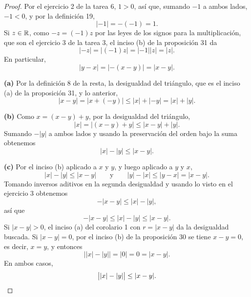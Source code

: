 \documentclass[12pt,a4paper]{article}
\begin{document}
    \begin{proof}
        Por el ejercicio 2 de la tarea 6, $1>0$, así que, sumando $-1$ a ambos lados, $-1<0$, y por la definición 19,
        \begin{equation*}
            |-1|=-(-1)=1.
        \end{equation*}
        Si $z\in\mathbb{R}$, como $-z=(-1)z$ por las leyes de los signos para la multiplicación, que son el ejercicio 3 de la tarea 3, el inciso (b) de la proposición 31 da
        \begin{equation*}
            |-z|=|(-1)z|=|-1||z|=|z|.
        \end{equation*}
        En particular,
        \begin{equation*}
            |y-x|=|-(x-y)|=|x-y|.
        \end{equation*}

        \textbf{(a)} Por la definición 8 de la resta, la desigualdad del triángulo, que es el inciso (a) de la proposición 31, y lo anterior,
        \begin{equation*}
            |x-y|=|x+(-y)|\leq|x|+|-y|=|x|+|y|.
        \end{equation*}

        \textbf{(b)} Como $x=(x-y)+y$, por la desigualdad del triángulo,
        \begin{equation*}
            |x|=|(x-y)+y|\leq|x-y|+|y|.
        \end{equation*}
        Sumando $-|y|$ a ambos lados y usando la preservación del orden bajo la suma obtenemos
        \begin{equation*}
            |x|-|y|\leq|x-y|.
        \end{equation*}

        \textbf{(c)} Por el inciso (b) aplicado a $x$ y $y$, y luego aplicado a $y$ y $x$,
        \begin{equation*}
            |x|-|y|\leq|x-y|\qquad\text{y}\qquad|y|-|x|\leq|y-x|=|x-y|.
        \end{equation*}
        Tomando inversos aditivos en la segunda desigualdad y usando lo visto en el ejercicio 3 obtenemos
        \begin{equation*}
            -|x-y|\leq|x|-|y|,
        \end{equation*}
        así que
        \begin{equation*}
            -|x-y|\leq|x|-|y|\leq|x-y|.
        \end{equation*}
        Si $|x-y|>0$, el inciso (a) del corolario 1 con $r=|x-y|$ da la desigualdad buscada. Si $|x-y|=0$, por el inciso (b) de la proposición 30 se tiene $x-y=0$, es decir, $x=y$, y entonces
        \begin{equation*}
            \bigl||x|-|y|\bigr|=|0|=0=|x-y|.
        \end{equation*}
        En ambos casos,
        \begin{equation*}
            \bigl||x|-|y|\bigr|\leq|x-y|.\qedhere
        \end{equation*}
    \end{proof}
\end{document}
